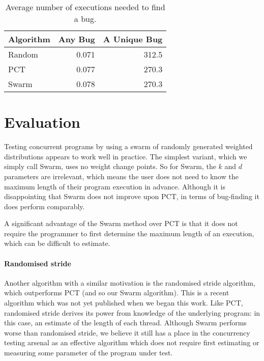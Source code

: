 \begin{table}
  \centering
  \begin{tabular}{lrr} \toprule
    Algorithm & Any Bug & A Unique Bug \\ \midrule
    Random & 0.071 & 312.5 \\
    PCT   & 0.077 & 270.3 \\
    Swarm & 0.078 & 270.3 \\ \bottomrule
  \end{tabular}
  \caption{Average number of executions needed to find a bug.}\label{tbl:freqs}
\end{table}

\section{Evaluation}
\label{sec:algorithms-eval}

Testing concurrent programs by using a swarm of randomly generated
weighted distributions appears to work well in practice.  The simplest
variant, which we simply call Swarm, uses no weight change points.  So
for Swarm, the $k$ and $d$ parameters are irrelevant, which means the
user does not need to know the maximum length of their program
execution in advance.  Although it is disappointing that Swarm does
not improve upon PCT, in terms of bug-finding it does perform
comparably.

A significant advantage of the Swarm method over PCT is that it does
not require the programmer to first determine the maximum length of an
execution, which can be difficult to estimate.

\paragraph{Randomised stride}
Another algorithm with a similar motivation is the randomised stride
algorithm\cite{abdelrasoul2017}, which outperforms PCT (and so our
Swarm algorithm).  This is a recent algorithm which was not yet
published when we began this work.  Like PCT, randomised stride
derives its power from knowledge of the underlying program: in this
case, an estimate of the length of each thread.  Although Swarm
performs worse than randomised stride, we believe it still has a place
in the concurrency testing arsenal as an effective algorithm which
does not require first estimating or measuring some parameter of the
program under test.

